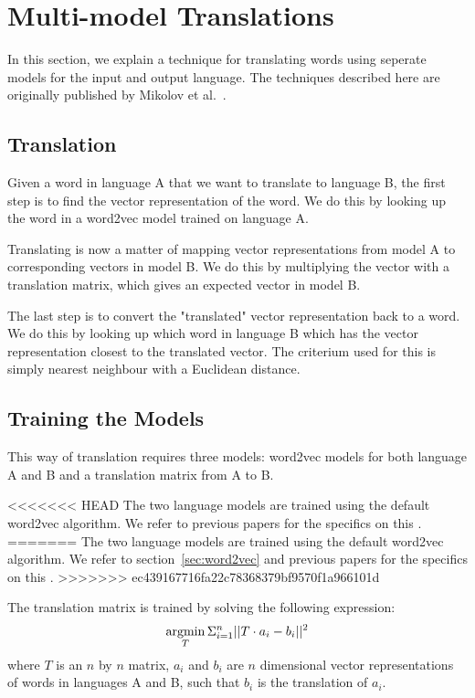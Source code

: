 \section{Multi-model Translations}
\label{sec:multi-model-translations}
In this section, we explain a technique for translating words using seperate models for the input and output language. The techniques described here are originally published by Mikolov et al.~\cite{mikolov2013exploiting}.

\subsection{Translation}
Given a word in language A that we want to translate to language B, the first step is to find the vector representation of the word. We do this by looking up the word in a word2vec model trained on language A.

Translating is now a matter of mapping vector representations from model A to corresponding vectors in model B. We do this by multiplying the vector with a translation matrix, which gives an expected vector in model B.

The last step is to convert the "translated" vector representation back to a word. We do this by looking up which word in language B which has the vector representation closest to the translated vector. The criterium used for this is simply nearest neighbour with a Euclidean distance.

\subsection{Training the Models}
This way of translation requires three models: word2vec models for both language A and B and a translation matrix from A to B.

<<<<<<< HEAD
The two language models are trained using the default word2vec algorithm. We refer to previous papers for the specifics on this \cite{mikolov2013efficient, mikolov2013distributed}.
=======
The two language models are trained using the default word2vec algorithm. We refer to section~\ref{sec:word2vec} and previous papers for the specifics on this \cite{mikolov2013efficient, mikolov2013distributed}.
>>>>>>> ec439167716fa22c78368379bf9570f1a966101d

The translation matrix is trained by solving the following expression:
$$ \argmin_{T} \Sigma_{i=1}^{n} || T \cdot a_i - b_i || ^{2}$$
where $T$ is an $n$ by $n$ matrix, $a_i$ and $b_i$ are $n$ dimensional vector representations of words in languages A and B, such that $b_i$ is the translation of $a_i$.


